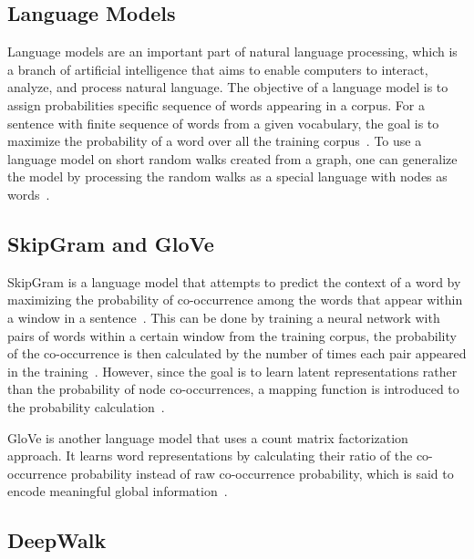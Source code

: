 \subsection{Language Models}

Language models are an important part of natural language processing, which is a branch of artificial intelligence that aims to enable computers to interact, analyze, and process natural language.
The objective of a language model is to assign probabilities specific sequence of words appearing in a corpus.
For a sentence with finite sequence of words from a given vocabulary, the goal is to maximize the probability of a word over all the training corpus~\cite{perozzi_deepwalk:_2014}.
To use a language model on short random walks created from a graph, one can generalize the model by processing the random walks as a special language with nodes as words~\cite{perozzi_deepwalk:_2014}.

\subsection{SkipGram and GloVe}

SkipGram is a language model that attempts to predict the context of a word by maximizing the probability of co-occurrence among the words that appear within a window in a sentence~\cite{perozzi_deepwalk:_2014}.
This can be done by training a neural network with pairs of words within a certain window from the training corpus, the probability of the co-occurrence is then calculated by the number of times each pair appeared in the training~\cite{mccormick_word2vec_nodate}.
However, since the goal is to learn latent representations rather than the probability of node co-occurrences, a mapping function is introduced to the probability calculation~\cite{perozzi_deepwalk:_2014}.

\ac{GloVe} is another language model that uses a count matrix factorization approach.
It learns word representations by calculating their ratio of the co-occurrence probability instead of raw co-occurrence probability, which is said to encode meaningful global information~\cite{pennington_glove:_2014}.

\subsection{DeepWalk}


